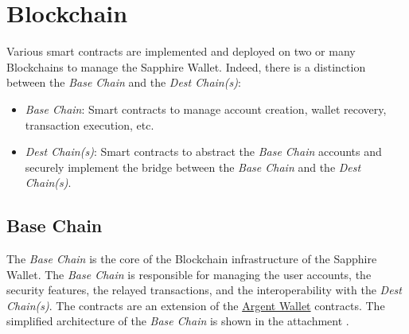 \section{Blockchain}
\label{sec:blockchain}

Various smart contracts are implemented  and deployed on two or many Blockchains to manage the Sapphire Wallet. Indeed, there is a distinction between the \textit{Base Chain} and the \textit{Dest Chain(s)}:
\begin{itemize}
    \item \textit{Base Chain}: Smart contracts to manage account creation, wallet recovery, transaction execution, etc.
    \item \textit{Dest Chain(s)}: Smart contracts to abstract the \textit{Base Chain} accounts and securely implement the bridge between the \textit{Base Chain} and the \textit{Dest Chain(s)}. 
\end{itemize}

\subsection{Base Chain}
\label{subsec:base_chain}

The \textit{Base Chain} is the core of the Blockchain infrastructure of the Sapphire Wallet. The \textit{Base Chain} is responsible for managing the user accounts, the security features, the relayed transactions, and the interoperability with the \textit{Dest Chain(s)}. The contracts are an extension of the \hyperref[subsec:argent]{Argent Wallet} contracts. The simplified architecture of the \textit{Base Chain} is shown in the attachment .

